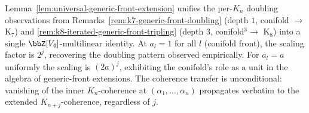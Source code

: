 \begin{remark}
\label{rem:universal-generic-front-extension-depth}
Lemma~\ref{lem:universal-generic-front-extension} unifies the per-$K_n$
doubling observations from Remarks~\ref{rem:k7-generic-front-doubling}
\textup{(}depth $1$, conifold $\to$ K$_7$\textup{)} and
\ref{rem:k8-iterated-generic-front-tripling} \textup{(}depth $3$,
conifold$^3 \to$ K$_8$\textup{)} into a single $\bbZ[V_4]$-multilinear
identity. At $a_l = 1$ for all $l$ \textup{(}conifold front\textup{)}, the
scaling factor is $2^j$, recovering the doubling pattern observed
empirically. For $a_l = a$ uniformly the scaling is $(2a)^j$, exhibiting
the conifold's role as a unit in the algebra of generic-front extensions.
The coherence transfer is unconditional: vanishing of the inner
$K_n$-coherence at $(\alpha_1, \ldots, \alpha_n)$ propagates verbatim to
the extended $K_{n+j}$-coherence, regardless of $j$.
\end{remark}



